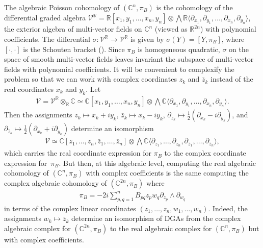 \documentclass[10pt,a4paper]{amsart}
\numberwithin{equation}{section}
\begin{document}
The algebraic Poisson cohomology of $({\mathbb C}^n,\pi_B)$ is the cohomology of the dif\/ferential graded algebra $\mathcal V^{\mathbb R}={\mathbb R}[x_1,y_1,\dots,x_n,y_n]\otimes \bigwedge {\mathbb R}\langle \partial_{x_1},\partial_{y_1},\dots,\partial_{x_n},\partial_{y_n}\rangle$, the exterior algebra of multi-vector f\/ields on ${\mathbb C}^n$ (viewed as ${\mathbb R}^{2n}$) with polynomial coef\/f\/icients. The dif\/ferential $\sigma\colon \mathcal V^{\mathbb R}\to\mathcal V^{\mathbb R}$ is given by $\sigma(Y)=[Y,\pi_B]$, where $[\cdot,\cdot]$ is the Schouten bracket (\cite{Vaisman}). Since $\pi_B$ is homogeneous quadratic, $\sigma$ on the space of smooth multi-vector f\/ields leaves invariant the subspace of multi-vector f\/ields with polynomial coef\/f\/icients. It will be convenient to complexify the problem so that we can work with complex coordinates $z_k$ and $\bar{z}_k$ instead of the real coordinates $x_k$ and $y_k$. Let
\begin{gather*}
\mathcal V=\mathcal V^{\mathbb R}\otimes_{\mathbb R}{\mathbb C} \simeq {\mathbb C}[x_1,y_1,\dots,x_n,y_n]\otimes \bigwedge {\mathbb C}\langle \partial_{x_1},\partial_{y_1},\dots,\partial_{x_n},\partial_{y_n}\rangle.
\end{gather*}
Then the assignments $z_k\mapsto x_k+iy_k$, $\bar{z}_k\mapsto x_k-iy_k$, $\partial_{z_k}\mapsto \frac{1}{2}(\partial_{x_k}-i\partial_{y_k})$, and $\partial_{\bar{z}_k}\mapsto \frac{1}{2}(\partial_{x_k}+i\partial_{y_k})$ determine an isomorphism
\begin{gather*}
\mathcal V\simeq {\mathbb C}[z_1,\dots,z_n,\bar{z}_1,\dots,\bar{z}_n]\otimes \bigwedge {\mathbb C}\langle \partial_{z_1},\dots,\partial_{z_n},\partial_{\bar{z}_1},\dots,\partial_{\bar{z}_n}\rangle,
\end{gather*}
which carries the real coordinate expression for $\pi_B$ to the complex coordinate expression for~$\pi_B$. But then, at this algebraic level, computing the real algebraic cohomology of $({\mathbb C}^n,\pi_B)$ with complex coef\/f\/icients is the same computing the complex algebraic cohomology of $({\mathbb C}^{2n},\pi_B)$ where
\begin{gather}\label{general_pi_z_w_with_factor}
\pi_B=-2i\sum_{p,q=1}^n B_{pq} z_pw_q\partial_{z_p}\wedge\partial_{w_q}
\end{gather}
in terms of the complex linear coordinates $(z_1,\dots,z_n,w_1,\dots,w_n)$. Indeed, the assignments $w_k\mapsto \bar{z}_k$ determine an isomorphism of DGAs from the complex algebraic complex for $({\mathbb C}^{2n},\pi_B)$ to the real algebraic complex for $({\mathbb C}^n,\pi_B)$ but with complex coef\/f\/icients.
\end{document}
